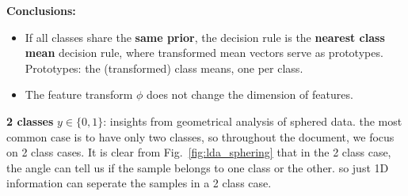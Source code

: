   \textbf{Conclusions:}\\
  \begin{itemize}
    \item If all classes share the \textbf{same prior},  the decision rule is the \textbf{nearest class mean} decision rule, where transformed mean vectors serve as prototypes.
    Prototypes: the (transformed) class means, one per class.
    \item The feature transform $\phi$ does not change the dimension of features.
  \end{itemize}
   \textbf{2 classes} $y\in\{0,1\}$: insights from geometrical analysis of sphered data. the most common case is to have only two classes, so throughout the document, we focus on 2 class cases. It is clear from Fig.~\ref{fig:lda_sphering} that in the 2 class case, the angle can tell us if the sample belongs to one class or the other. so just 1D information can seperate the samples in a 2 class case. 



